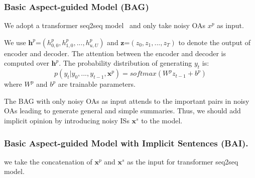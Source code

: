 {\subsubsection{Basic Aspect-guided Model (BAG)}
We adopt a transformer seq2seq model~\cite{Transformer17}
and only take noisy OAs $x^p$ as input.

We use $\textbf{h}^p$=$(h^p_{0,0}, h^p_{1,0},...,h^p_{u,U})$ and 
$\textbf{z}$=$(z_0, z_1,...,z_T)$ to denote the output of encoder and decoder.
The attention between the encoder and decoder is computed over $\textbf{h}^p$.
The probability distribution of 
generating $y_t$ is:
\begin{equation}
p(y_t|y_0,...,y_{t-1}, \textbf{x}^p)=softmax(W^pz_{t-1}+b^p)
\label{eq:decode}
\end{equation}
where $W^p$ and $b^p$ are trainable parameters.

The BAG with only noisy OAs as input attends to the important pairs in noisy OAs leading to generate general and simple summaries.
Thus, we should add implicit opinion by introducing noisy ISs $\textbf{x}^s$ to the model.

\subsubsection{Basic Aspect-guided Model with Implicit Sentences (BAI).} 
we take the concatenation of $\textbf{x}^p$ and $\textbf{x}^s$
as the input for transformer seq2seq model. 



}
